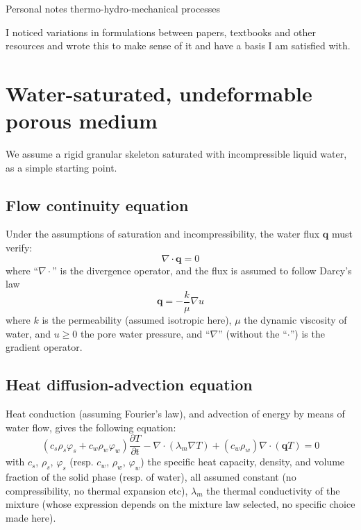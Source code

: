 \documentclass[letterpaper,12pt,oneside]{report}
\begin{document}
\begin{center}
Personal notes thermo-hydro-mechanical processes
\end{center}


I noticed variations in formulations between papers, textbooks and other resources and wrote this to make sense of it and have a basis I am satisfied with.

\section{Water-saturated, undeformable porous medium}

We assume a rigid granular skeleton saturated with incompressible liquid water, as a simple starting point.

\subsection{Flow continuity equation}

Under the assumptions of saturation and incompressibility, the water flux $\bm{q}$ must verify:
\begin{equation}
\nabla \cdot \bm{q} = 0
\end{equation}
where ``$\nabla \cdot$'' is the divergence operator, and the flux is assumed to follow Darcy's law
\begin{equation}
    \bm{q} = - \frac{k}{\mu} \nabla u
\end{equation}
where $k$ is the permeability (assumed isotropic here), $\mu$ the dynamic viscosity of water, and $u \geq 0$ the pore water pressure, and ``$\nabla$'' (without the ``$\cdot$'') is the gradient operator.

\subsection{Heat diffusion-advection equation}

Heat conduction (assuming Fourier's law), and advection of energy by means of water flow, gives the following equation:
\begin{equation}
(c_s \rho_s \varphi_s + c_w \rho_w \varphi_w) \frac{\partial T}{\partial t} - \nabla \cdot (\lambda_m \nabla T) + (c_w \rho_w) \nabla \cdot (\bm{q}T) = 0
\end{equation}
with $c_s$, $\rho_s$, $\varphi_s$ (resp. $c_w$, $\rho_w$, $\varphi_w$) the specific heat capacity, density, and volume fraction of the solid phase (resp. of water), all assumed constant (no compressibility, no thermal expansion etc), $\lambda_m$ the thermal conductivity of the mixture (whose expression depends on the mixture law selected, no specific choice made here).
\end{document}
